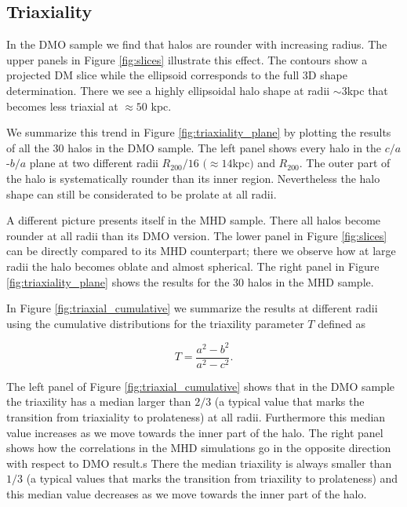 \documentclass[usenatbib]{mnras}
\begin{document}
\subsection{Triaxiality}

In the DMO sample we find that halos are rounder with increasing radius.
The upper panels in Figure \ref{fig:slices} illustrate this effect.
The contours show a projected DM slice while the ellipsoid corresponds
to the full 3D shape determination. 
There we see a highly ellipsoidal halo shape at radii $\sim 3$kpc
that becomes less triaxial at $\approx 50$ kpc.

We summarize this trend in Figure \ref{fig:triaxiality_plane} by
plotting the results of all the 30 halos in the DMO sample.
The left panel shows every halo in the $c/a$-$b/a$ plane at
two different radii $R_{200}/16$ $(\approx 14$kpc$)$ and $R_{200}$. 
The outer part of the halo is systematically rounder than its inner
region. 
Nevertheless the halo shape can still be considerated to be prolate at
all radii. 

A different picture presents itself in the MHD sample.
There all halos become rounder at all radii than its DMO
version.
The lower panel in Figure \ref{fig:slices} can be directly compared to
its MHD counterpart; there we observe how at large radii the halo
becomes oblate and almost spherical. 
The right panel in Figure \ref{fig:triaxiality_plane} shows the
results for the 30 halos in the MHD sample.

In Figure \ref{fig:triaxial_cumulative} we summarize the results at
different radii using the cumulative distributions for the 
triaxility parameter $T$ defined as 

\begin{equation}
T=\frac{a^2-b^2}{a^2-c^2}.
\label{eq:triaxiality}
\end{equation}

The left panel of Figure \ref{fig:triaxial_cumulative} shows that in
the DMO sample the triaxility has a median larger than $2/3$ (a
typical value that marks the transition from triaxiality to
prolateness) at all radii. 
Furthermore this median value increases as we move towards the inner part of the
halo.
The right panel shows how the correlations in the MHD simulations go
in the opposite direction with respect to DMO result.s
There the median triaxility is always smaller than $1/3$ (a typical
values that marks the transition from triaxility to prolateness) and this
median value decreases as we move towards the inner part of the halo.
\end{document}
